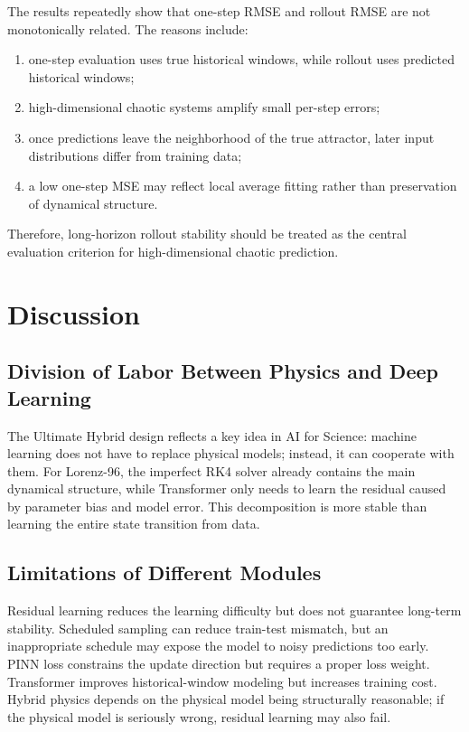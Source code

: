 \documentclass[a4paper,12pt]{article}
\begin{document}
The results repeatedly show that one-step RMSE and rollout RMSE are not monotonically related. The reasons include:
\begin{enumerate}
    \item one-step evaluation uses true historical windows, while rollout uses predicted historical windows;
    \item high-dimensional chaotic systems amplify small per-step errors;
    \item once predictions leave the neighborhood of the true attractor, later input distributions differ from training data;
    \item a low one-step MSE may reflect local average fitting rather than preservation of dynamical structure.
\end{enumerate}
Therefore, long-horizon rollout stability should be treated as the central evaluation criterion for high-dimensional chaotic prediction.

\section{Discussion}

\subsection{Division of Labor Between Physics and Deep Learning}

The Ultimate Hybrid design reflects a key idea in AI for Science: machine learning does not have to replace physical models; instead, it can cooperate with them. For Lorenz-96, the imperfect RK4 solver already contains the main dynamical structure, while Transformer only needs to learn the residual caused by parameter bias and model error. This decomposition is more stable than learning the entire state transition from data.

\subsection{Limitations of Different Modules}

Residual learning reduces the learning difficulty but does not guarantee long-term stability. Scheduled sampling can reduce train-test mismatch, but an inappropriate schedule may expose the model to noisy predictions too early. PINN loss constrains the update direction but requires a proper loss weight. Transformer improves historical-window modeling but increases training cost. Hybrid physics depends on the physical model being structurally reasonable; if the physical model is seriously wrong, residual learning may also fail.
\end{document}
